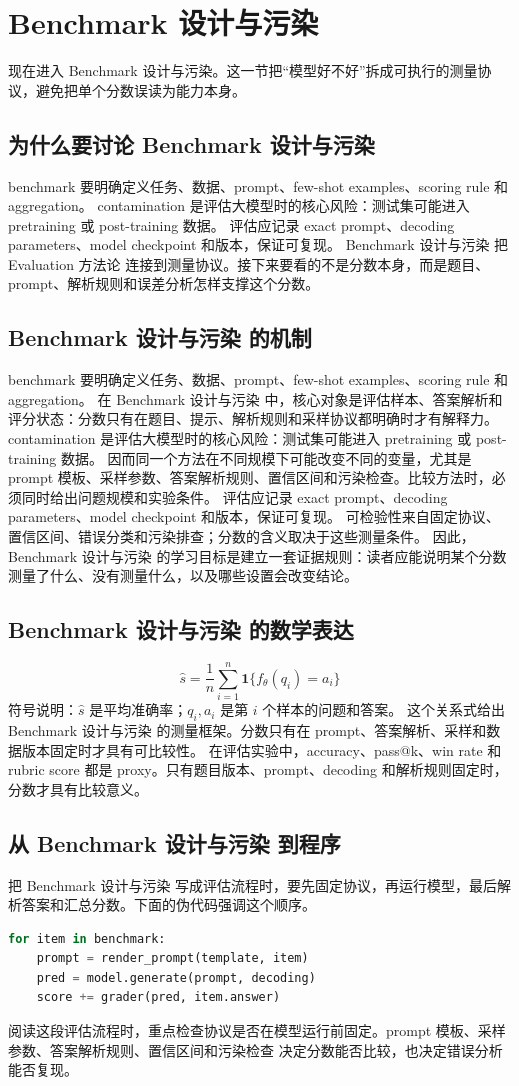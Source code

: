 \documentclass[a4paper]{article}
\begin{document}
\section{Benchmark 设计与污染}
现在进入 Benchmark 设计与污染。这一节把“模型好不好”拆成可执行的测量协议，避免把单个分数误读为能力本身。
\subsection{为什么要讨论 Benchmark 设计与污染}
benchmark 要明确定义任务、数据、prompt、few-shot examples、scoring rule 和 aggregation。
contamination 是评估大模型时的核心风险：测试集可能进入 pretraining 或 post-training 数据。
评估应记录 exact prompt、decoding parameters、model checkpoint 和版本，保证可复现。
Benchmark 设计与污染 把 Evaluation 方法论 连接到测量协议。接下来要看的不是分数本身，而是题目、prompt、解析规则和误差分析怎样支撑这个分数。
\subsection{Benchmark 设计与污染 的机制}
benchmark 要明确定义任务、数据、prompt、few-shot examples、scoring rule 和 aggregation。 在 Benchmark 设计与污染 中，核心对象是评估样本、答案解析和评分状态：分数只有在题目、提示、解析规则和采样协议都明确时才有解释力。
contamination 是评估大模型时的核心风险：测试集可能进入 pretraining 或 post-training 数据。 因而同一个方法在不同规模下可能改变不同的变量，尤其是prompt 模板、采样参数、答案解析规则、置信区间和污染检查。比较方法时，必须同时给出问题规模和实验条件。
评估应记录 exact prompt、decoding parameters、model checkpoint 和版本，保证可复现。 可检验性来自固定协议、置信区间、错误分类和污染排查；分数的含义取决于这些测量条件。
因此，Benchmark 设计与污染 的学习目标是建立一套证据规则：读者应能说明某个分数测量了什么、没有测量什么，以及哪些设置会改变结论。
\subsection{Benchmark 设计与污染 的数学表达}
\[\hat s=\frac{1}{n}\sum_{i=1}^{n}\mathbf{1}\{f_\theta(q_i)=a_i\}\]
符号说明：\(\hat s\) 是平均准确率；\(q_i,a_i\) 是第 \(i\) 个样本的问题和答案。
这个关系式给出 Benchmark 设计与污染 的测量框架。分数只有在 prompt、答案解析、采样和数据版本固定时才具有可比较性。
在评估实验中，accuracy、pass@k、win rate 和 rubric score 都是 proxy。只有题目版本、prompt、decoding 和解析规则固定时，分数才具有比较意义。
\subsection{从 Benchmark 设计与污染 到程序}
把 Benchmark 设计与污染 写成评估流程时，要先固定协议，再运行模型，最后解析答案和汇总分数。下面的伪代码强调这个顺序。
\begin{lstlisting}[language=Python]
for item in benchmark:
    prompt = render_prompt(template, item)
    pred = model.generate(prompt, decoding)
    score += grader(pred, item.answer)
\end{lstlisting}
阅读这段评估流程时，重点检查协议是否在模型运行前固定。prompt 模板、采样参数、答案解析规则、置信区间和污染检查 决定分数能否比较，也决定错误分析能否复现。
\end{document}
